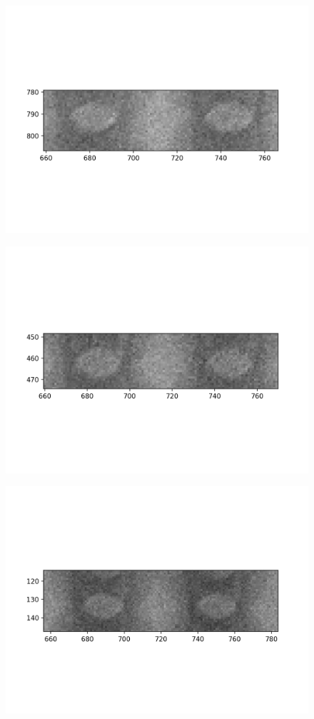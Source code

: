 \documentclass[10pt,a4paper]{article}
\begin{document}
\begin{figure}
	\includegraphics{data/image_stamps/c7}
\end{figure}
\begin{figure}
	\includegraphics{data/image_stamps/c8}
\end{figure}
\begin{figure}
	\includegraphics{data/image_stamps/c9}
\end{figure}
\end{document}
